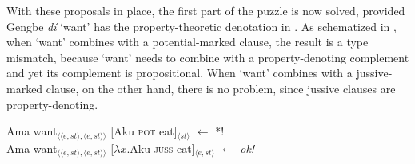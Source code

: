 \documentclass[output=paper,modfonts,nonflat]{langsci/langscibook}
\begin{document}

With these proposals in place, the first part of the puzzle is now solved, provid\-ed Gengbe \emph{d{\Z}\'i} `want' has the property-theoretic denotation in . As schematized in , when `want' combines with a potential-marked clause, the result is a type mismatch, because `want' needs to combine with a property-denoting complement and yet its complement is propositional. When `want' combines with a jussive-marked clause, on the other hand, there is no problem, since jussive clauses are property-denoting.


\ea \label{ex:grano:p1s:27}
    \begin{xlist}
    \ex Ama want$_{\langle\langle e,st\rangle,\langle e,st\rangle\rangle}$ [Aku \textsc{pot} eat]$_{\langle st\rangle}$  \hfill $\leftarrow$ *!\\
    \ex Ama want$_{\langle\langle e,st\rangle,\langle e,st\rangle\rangle}$ [$\lambda x$.Aku \textsc{juss} eat]$_{\langle e,st\rangle}$   \hfill $\leftarrow$ \emph{ok!} 
    \end{xlist}
\z
\end{document}

